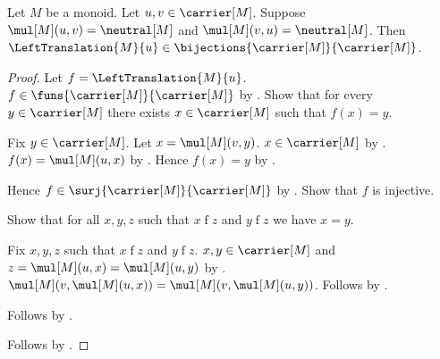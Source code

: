 \begin{theorem}\label{monoid_unit_left_translation_bijection}
    Let $M$ be a monoid.
    Let $u,v\in\carrier[M]$.
    Suppose $\mul[M](u,v)=\neutral[M]$ and
        $\mul[M](v,u)=\neutral[M]$.
    Then $\LeftTranslation{M}{u}\in
        \bijections{\carrier[M]}{\carrier[M]}$.
\end{theorem}
\begin{proof}
    Let $f=\LeftTranslation{M}{u}$.
    $f\in\funs{\carrier[M]}{\carrier[M]}$
        by .
    Show that for every $y\in\carrier[M]$ there exists
        $x\in\carrier[M]$ such that $f(x)=y$.
    \begin{subproof}
        Fix $y\in\carrier[M]$.
        Let $x=\mul[M](v,y)$.
        $x\in\carrier[M]$ by .
        $f(x)=\mul[M](u,x)$ by .
        Hence $f(x)=y$ by
            .
    \end{subproof}
    Hence $f\in\surj{\carrier[M]}{\carrier[M]}$ by .
    Show that $f$ is injective.
    \begin{subproof}
        Show that for all $x,y,z$ such that $x\mathrel{f}z$ and
            $y\mathrel{f}z$ we have $x=y$.
        \begin{subproof}
            Fix $x,y,z$ such that $x\mathrel{f}z$ and $y\mathrel{f}z$.
            $x,y\in\carrier[M]$ and
                $z=\mul[M](u,x)=\mul[M](u,y)$
                by .
            $\mul[M](v,\mul[M](u,x))
                =\mul[M](v,\mul[M](u,y))$.
            Follows by
                .
        \end{subproof}
        Follows by .
    \end{subproof}
    Follows by .
\end{proof}

